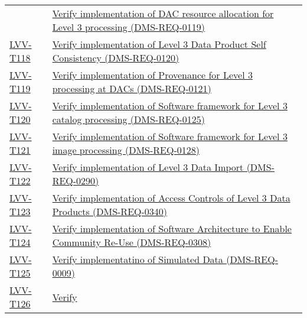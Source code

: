 \begin{longtable}[]{@{}ll@{}}
&
\href{https://jira.lsstcorp.org/secure/Tests.jspa\#/testCase/LVV-T117}{Verify
implementation of DAC resource allocation for Level 3 processing
(DMS-REQ-0119)}\tabularnewline
\protect\hyperlink{lvv-t118---verify-implementation-of-level-3-data-product-self-consistency-dms-req-0120}{LVV-T118}
&
\href{https://jira.lsstcorp.org/secure/Tests.jspa\#/testCase/LVV-T118}{Verify
implementation of Level 3 Data Product Self Consistency
(DMS-REQ-0120)}\tabularnewline
\protect\hyperlink{lvv-t119---verify-implementation-of-provenance-for-level-3-processing-at-dacs-dms-req-0121}{LVV-T119}
&
\href{https://jira.lsstcorp.org/secure/Tests.jspa\#/testCase/LVV-T119}{Verify
implementation of Provenance for Level 3 processing at DACs
(DMS-REQ-0121)}\tabularnewline
\protect\hyperlink{lvv-t120---verify-implementation-of-software-framework-for-level-3-catalog-processing-dms-req-0125}{LVV-T120}
&
\href{https://jira.lsstcorp.org/secure/Tests.jspa\#/testCase/LVV-T120}{Verify
implementation of Software framework for Level 3 catalog processing
(DMS-REQ-0125)}\tabularnewline
\protect\hyperlink{lvv-t121---verify-implementation-of-software-framework-for-level-3-image-processing-dms-req-0128}{LVV-T121}
&
\href{https://jira.lsstcorp.org/secure/Tests.jspa\#/testCase/LVV-T121}{Verify
implementation of Software framework for Level 3 image processing
(DMS-REQ-0128)}\tabularnewline
\protect\hyperlink{lvv-t122---verify-implementation-of-level-3-data-import-dms-req-0290}{LVV-T122}
&
\href{https://jira.lsstcorp.org/secure/Tests.jspa\#/testCase/LVV-T122}{Verify
implementation of Level 3 Data Import (DMS-REQ-0290)}\tabularnewline
\protect\hyperlink{lvv-t123---verify-implementation-of-access-controls-of-level-3-data-products-dms-req-0340}{LVV-T123}
&
\href{https://jira.lsstcorp.org/secure/Tests.jspa\#/testCase/LVV-T123}{Verify
implementation of Access Controls of Level 3 Data Products
(DMS-REQ-0340)}\tabularnewline
\protect\hyperlink{lvv-t124---verify-implementation-of--software-architecture-to-enable-community-re-use-dms-req-0308}{LVV-T124}
&
\href{https://jira.lsstcorp.org/secure/Tests.jspa\#/testCase/LVV-T124}{Verify
implementation of Software Architecture to Enable Community Re-Use
(DMS-REQ-0308)}\tabularnewline
\protect\hyperlink{lvv-t125---verify-implementatino-of--simulated-data-dms-req-0009}{LVV-T125}
&
\href{https://jira.lsstcorp.org/secure/Tests.jspa\#/testCase/LVV-T125}{Verify
implementatino of Simulated Data (DMS-REQ-0009)}\tabularnewline
\protect\hyperlink{lvv-t126---verify-implementation--image-differencing-dms-req-0032}{LVV-T126}
&
\href{https://jira.lsstcorp.org/secure/Tests.jspa\#/testCase/LVV-T126}{Verify
}
\end{longtable}
